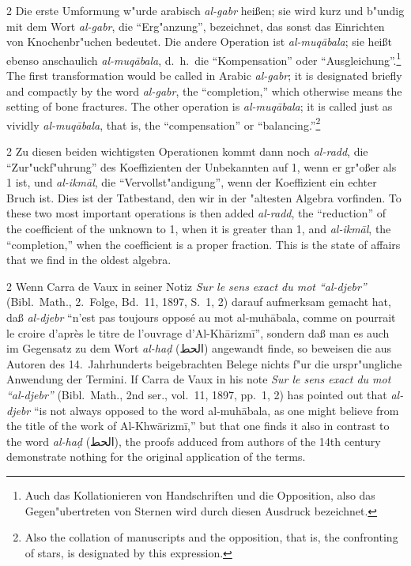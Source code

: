 \documentclass[10pt,a4paper]{article}
\renewcommand{\switchcolumn}{\syncronize\nointerlineskip\columnbreak}
\newcommand{\RL}[1]{\beginR#1\endR}
\newcommand{\ar}[1]{{\arabicfont\RL{#1}}}
\newcommand{\enquote}[1]{``#1''}
\begin{document}
\begin{paracol}{2}
Die erste Umformung w"urde arabisch \textit{al-gabr} hei\ss{}en; sie wird kurz und b"undig mit dem Wort \textit{al-gabr}, die \enquote{Erg"anzung}, bezeichnet, das sonst das Einrichten von Knochenbr"uchen bedeutet. Die andere Operation ist \textit{al-muq\=abala}; sie hei\ss{}t ebenso anschaulich \textit{al-muq\=abala}, d.\ h.\ die \enquote{Kompensation} oder \enquote{Ausgleichung}.\footnote{Auch das Kollationieren von Handschriften und die Opposition, also das Gegen"ubertreten von Sternen wird durch diesen Ausdruck bezeichnet.}
\switchcolumn
The first transformation would be called in Arabic \textit{al-gabr}; it is designated briefly and compactly by the word \textit{al-gabr}, the ``completion,'' which otherwise means the setting of bone fractures. The other operation is \textit{al-muq\=abala}; it is called just as vividly \textit{al-muq\=abala}, that is, the ``compensation'' or ``balancing.''\footnote{Also the collation of manuscripts and the opposition, that is, the confronting of stars, is designated by this expression.}
\end{paracol}

\begin{paracol}{2}
Zu diesen beiden wichtigsten Operationen kommt dann noch \textit{al-radd}, die \enquote{Zur"uckf"uhrung} des Koeffizienten der Unbekannten auf 1, wenn er gr"o\ss{}er als 1 ist, und \textit{al-ikm\=al}, die \enquote{Vervollst"andigung}, wenn der Koeffizient ein echter Bruch ist. Dies ist der Tatbestand, den wir in der "altesten Algebra vorfinden.
\switchcolumn
To these two most important operations is then added \textit{al-radd}, the ``reduction'' of the coefficient of the unknown to 1, when it is greater than 1, and \textit{al-ikm\=al}, the ``completion,'' when the coefficient is a proper fraction. This is the state of affairs that we find in the oldest algebra.
\end{paracol}

\begin{paracol}{2}
Wenn Carra de Vaux in seiner Notiz \textit{Sur le sens exact du mot \enquote{al-djebr}} (Bibl.\ Math., 2.\ Folge, Bd.\ 11, 1897, S.\ 1, 2) darauf aufmerksam gemacht hat, da\ss{} \textit{al-djebr} \enquote{n'est pas toujours oppos\'e au mot al-muh\=abala, comme on pourrait le croire d'apr\`es le titre de l'ouvrage d'Al-Kh\=arizm\=i}, sondern da\ss{} man es auch im Gegensatz zu dem Wort \textit{al-ha\d{d}} (\ar{الحط}) angewandt finde, so beweisen die aus Autoren des 14.\ Jahrhunderts beigebrachten Belege nichts f"ur die urspr"ungliche Anwendung der Termini.
\switchcolumn
If Carra de Vaux in his note \textit{Sur le sens exact du mot ``al-djebr''} (Bibl.\ Math., 2nd ser., vol.\ 11, 1897, pp.\ 1, 2) has pointed out that \textit{al-djebr} ``is not always opposed to the word al-muh\=abala, as one might believe from the title of the work of Al-Khw\=arizm\={i},'' but that one finds it also in contrast to the word \textit{al-ha\d{d}} (\ar{الحط}), the proofs adduced from authors of the 14th century demonstrate nothing for the original application of the terms.
\end{paracol}
\end{document}
